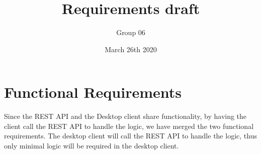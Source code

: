 \documentclass[a4paper,12pt]{article}
\title{Requirements draft}
\author{Group 06}
\date{March 26th 2020}
\begin{document}

\maketitle

\newpage
\thispagestyle{empty}

\newpage



\section{Functional Requirements}
Since the REST API and the Desktop client share functionality, by having the client call the REST API to handle the logic, we have merged the two functional requirements. The desktop client will call the REST API to handle the logic, thus only minimal logic will be required in the desktop client.
\end{document}
